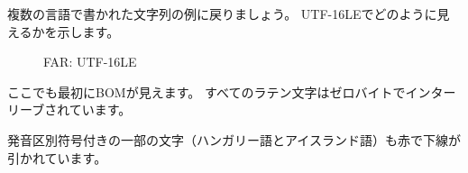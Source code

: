 複数の言語で書かれた文字列の例に戻りましょう。
UTF-16LEでどのように見えるかを示します。

\begin{figure}[H]
\centering
{}
\caption{FAR: UTF-16LE}
\end{figure}

ここでも最初に\ac{BOM}が見えます。
すべてのラテン文字はゼロバイトでインターリーブされています。

発音区別符号付きの一部の文字（ハンガリー語とアイスランド語）も赤で下線が引かれています。

